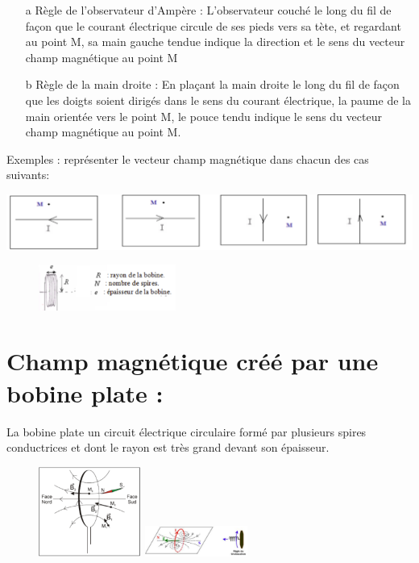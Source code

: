 \documentclass[12pt]{article}
\begin{document}
  \begin{enumerate}
    \item[a] Règle de l'observateur d'Ampère : L'observateur couché le long du fil de façon que le courant électrique circule de ses pieds vers sa tète, et regardant au point M, sa main gauche tendue indique la direction et le sens du vecteur champ magnétique au point M

    \item[b] Règle de la main droite : En plaçant la main droite le long du fil de façon que les doigts soient dirigés dans le sens du courant électrique, la
paume de la main orientée vers le point M, le pouce tendu indique le sens du vecteur champ magnétique au point M.

  \end{enumerate}

  Exemples : représenter le vecteur champ magnétique dans chacun des cas suivants:

    \includegraphics[width=1\textwidth]{./img/Exemple.png}

\begin{figure}
    \includegraphics[width=0.4\textwidth]{./img/bobine plate.png}

\end{figure}

  \section{Champ magnétique créé par une bobine plate :}
La bobine plate un circuit électrique circulaire formé par plusieurs spires conductrices et dont le rayon est très
grand devant son épaisseur.

\begin{figure}
    \includegraphics[width=0.3\textwidth]{./img/SpectreBobine_plate.png}
    \includegraphics[width=0.3\textwidth]{./img/spect_2plate.png}

\end{figure}
\end{document}
